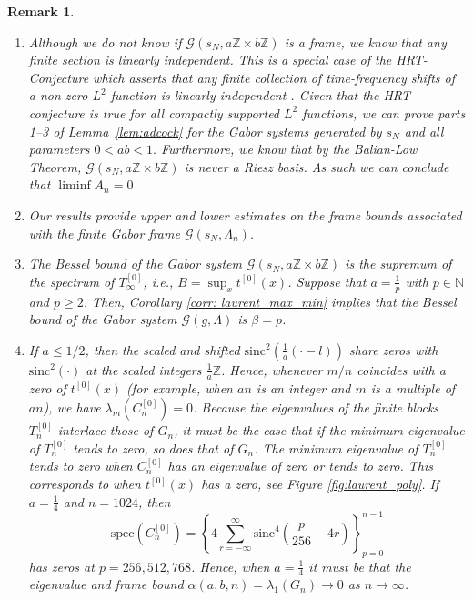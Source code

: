 \documentclass{article}
\newtheorem{remark}[theorem]{Remark}
\begin{document}
\begin{remark}
\begin{enumerate}
\item Although we do not know if $\mathcal{G}(s_N,a\mathbb{Z}\times b\mathbb{Z})$ is a frame, we know that any finite section is linearly independent. This is a special case of the HRT-Conjecture which asserts that any finite collection of time-frequency shifts of a non-zero $L^2$ function is linearly independent \cite{heil1996linear, heil2007history}. Given that the HRT-conjecture is true for all compactly supported $L^2$ functions, we can prove parts 1--3 of Lemma~\ref{lem:adcock} for the Gabor systems generated by $s_N$ and all parameters $0<ab<1.$ Furthermore, we know that by the Balian-Low Theorem, $\mathcal{G}(s_N, a\mathbb{Z}\times b\mathbb{Z})$ is never a Riesz basis. As such we can conclude that $\liminf A_n=0$
\item Our results  provide upper and lower estimates on the frame bounds associated with the finite Gabor frame $\mathcal{G}(s_N,\Lambda_n)$.
\item The Bessel bound of the Gabor
system $\mathcal{G}(s_N,a\mathbb{Z}\times b\mathbb{Z})$ is the supremum of the spectrum of $T_{\infty}^{[0]}$, i.e., $B = \sup_x t^{[0]}(x)$. Suppose that $a = \tfrac{1}{p}$ with $p\in\mathbb{N}$ and $p\ge 2$. Then, Corollary \ref{corr: laurent_max_min} implies that  the Bessel bound of the Gabor system
$\mathcal{G}(g,\Lambda)$ is $\beta = p$. 
\item If $a \leq 1/2$, then the scaled and shifted $\text{sinc}^2(\frac{1}{a}(\cdot-l))$ share zeros with $\text{sinc}^2(\cdot)$ at the scaled integers $\frac{1}{a}\mathbb{Z}$. Hence, whenever $m/n$ coincides with a zero of $t^{[0]}(x)$ (for example, when $a n$ is an integer and $m$ is a multiple of $a n$), we have $\lambda_m(C_n^{[0]}) = 0$. Because the eigenvalues of the finite blocks $T_n^{[0]}$ interlace those of ${G}_n$, it must be the case that if the minimum eigenvalue of $T_n^{[0]}$ tends to zero, so does that of ${G}_n$. The minimum eigenvalue of $T_n^{[0]}$ tends to zero when $C_n^{[0]}$ has an eigenvalue of zero or tends to zero. This corresponds to when $t^{[0]}(x)$ has a zero, see Figure \ref{fig:laurent_poly}. If $a=\frac{1}{4}$ and $n=1024$, then 
\begin{equation} \label{eq: circ_eig}
    \textrm{spec}(C_n^{[0]})  = \left\{4 \sum_{r=-\infty}^{\infty} \text{sinc}^4 (\frac{p}{256}-4r )\right\}_{p=0}^{n-1}
\end{equation}
has zeros at $p=256, 512, 768$. Hence, when $a=\frac{1}{4}$ it must be that the eigenvalue and frame bound $\alpha(a,b,n)=\lambda_1(G_n)\rightarrow 0$ as $n\to \infty$.


\end{enumerate}
 
\end{remark}
\end{document}
